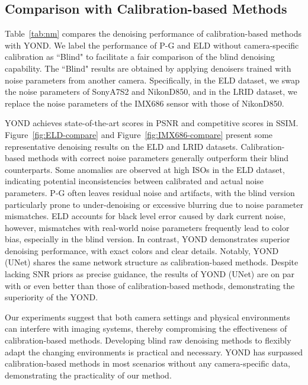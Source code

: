 \documentclass[lettersize,journal]{IEEEtran}
\begin{document}
	\subsection{Comparison with Calibration-based Methods}
	Table~\ref{tab:nm} compares the denoising performance of calibration-based methods with YOND. We label the performance of P-G and ELD without camera-specific calibration as ``Blind" to facilitate a fair comparison of the blind denoising capability. The ``Blind" results are obtained by applying denoisers trained with noise parameters from another camera. Specifically, in the ELD dataset, we swap the noise parameters of SonyA7S2 and NikonD850, and in the LRID dataset, we replace the noise parameters of the IMX686 sensor with those of NikonD850.
	
	YOND achieves state-of-the-art scores in PSNR and competitive scores in SSIM. Figure~\ref{fig:ELD-compare} and Figure~\ref{fig:IMX686-compare} present some representative denoising results on the ELD and LRID datasets. Calibration-based methods with correct noise parameters generally outperform their blind counterparts. Some anomalies are observed at high ISOs in the ELD dataset, indicating potential inconsistencies between calibrated and actual noise parameters.
	P-G often leaves residual noise and artifacts, with the blind version particularly prone to under-denoising or excessive blurring due to noise parameter mismatches. 
	ELD accounts for black level error caused by dark current noise, however, mismatches with real-world noise parameters frequently lead to color bias, especially in the blind version.
	In contrast, YOND demonstrates superior denoising performance, with exact colors and clear details. Notably, YOND (UNet) shares the same network structure as calibration-based methods. Despite lacking SNR priors as precise guidance, the results of YOND (UNet) are on par with or even better than those of calibration-based methods, demonstrating the superiority of the YOND.
	
	Our experiments suggest that both camera settings and physical environments can interfere with imaging systems, thereby compromising the effectiveness of calibration-based methods. Developing blind raw denoising methods to flexibly adapt the changing environments is practical and necessary. YOND has surpassed calibration-based methods in most scenarios without any camera-specific data, demonstrating the practicality of our method.
	
\end{document}
